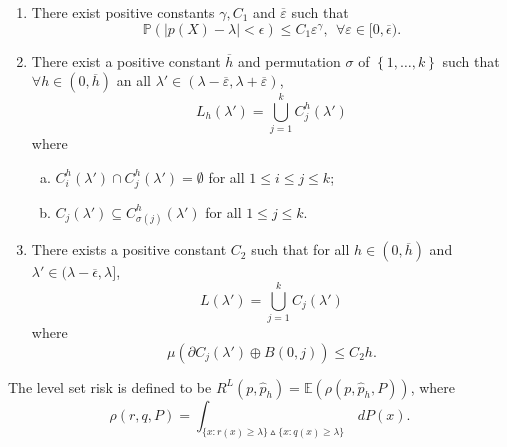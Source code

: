 \documentclass{article}
\newcommand{\abs}[1]{\left \lvert #1 \right \rvert}
\newcommand{\set}[1]{\left\{#1\right\}}
\newcommand{\1}{\mathbb{I}}
\theoremstyle{alden}
\theoremstyle{aldenthm}
\theoremstyle{definition}
\theoremstyle{remark}
\begin{document}
\begin{enumerate}[label=(C\arabic*)]
	\item 
	\label{cond:low_noise}There exist positive constants $\gamma, C_1$ and $\overline{\varepsilon}$ such that
	\begin{equation*}
	\mathbb{P}\left(\abs{p(X) - \lambda} < \epsilon\right)\leq C_1 \varepsilon^{\gamma},~~ \forall \varepsilon \in [0,\overline{\epsilon}).
	\end{equation*}
	
	\item 
	\label{cond:level_set_inclusion}There exist a positive constant $\overline{h}$ and permutation $\sigma$ of $\set{1,\ldots,k}$ such that $\forall h \in (0,\overline{h})$ an all $\lambda' \in (\lambda - \overline{\varepsilon}, \lambda + \overline{\varepsilon})$, 
	\begin{equation*}
	L_h(\lambda') = \bigcup_{j = 1}^{k} C_j^h(\lambda')
	\end{equation*}
	where
	\begin{enumerate}[(a)]
		\item $C_i^h(\lambda') \cap C_j^h(\lambda') = \emptyset$ for all $1 \leq i \leq j \leq k$; 
		\item $C_j(\lambda') \subseteq C_{\sigma(j)}^h(\lambda')$ for all $1 \leq j \leq k$. 
	\end{enumerate}

	\item 
	\label{cond:fringe_bias}There exists a positive constant $C_2$ such that for all $h \in (0,\overline{h})$ and $\lambda' \in (\lambda - \overline{\epsilon},\lambda]$,
	\begin{equation*}
	L(\lambda') = \bigcup_{j = 1}^{k} C_j(\lambda')
	\end{equation*}
	where
	\begin{equation*}
	\mu(\partial C_j(\lambda') \oplus B(0,j)) \leq C_2 h.
	\end{equation*}
\end{enumerate}

The level set risk is defined to be $R^L(p,\widehat{p}_h) = \mathbb{E}(\rho(p,\widehat{p}_h,P))$, where
\begin{equation*}
\rho(r,q,P) = \int_{ \{x: r(x) \geq \lambda\} \vartriangle \{x: q(x) \geq \lambda\}} \,dP(x).
\end{equation*}
\end{document}
